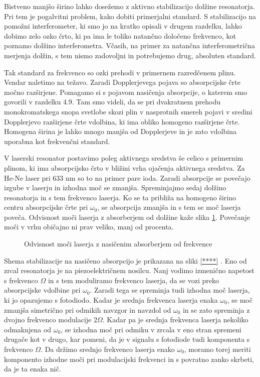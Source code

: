 Bistveno manjšo širino lahko dosežemo z aktivno stabilizacijo dolžine
resonatorja. Pri tem je pogalvitni problem, kako dobiti primerjalni
standard. S stabilizacijo na pomožni interferometer, ki smo jo na kratko
opisali v drugem razdelku, lahko dobimo zelo ozko črto, ki pa ima le toliko
natančno določeno frekvenco, kot poznamo dolžino interferometra. Včasih,
na primer za natančna interferometrična merjenja dolžin, s tem nismo
zadovoljni in potrebujemo drug, absoluten standard.

Tak standard za frekvenco so ozki prehodi v primernem razredčenem plinu.
Vendar naletimo na težavo. Zaradi Dopplerjevega pojava so absorpcijske
črte močno razširjene. Pomagamo si s pojavom nasičenja absorpcije, o katerem
smo govorili v razdelku 4.9. Tam smo videli, da se pri dvakratnem prehodu
monokromatskega snopa svetlobe skozi plin v nasprotnih smereh pojavi v
sredini Dopplerjevo razširjene črte vdolbina, ki ima obliko homogeno
razširjene črte. Homogena širina je lahko mnogo manjša od Dopplerjeve in
je zato vdolbina uporabna kot frekvenčni standard.

V laserski resonator postavimo poleg aktivnega sredstva še celico s
primernim plinom, ki ima absorpcijsko črto v bližini vrha ojačenja
aktivnega sredstva. Za He-Ne laser pri 633 nm so to na primer pare ioda.
Zaradi absorpcije se povečajo izgube v laserju in izhodna moč se zmanjša.
Spreminjajmo sedaj dolžino resonatorja in s tem frekvenco laserja. Ko se ta
približa na homogeno širino centru absorpcijske črte pri $\omega_0$, se
absorpcija zmanjša in s tem se moč laserja poveča. Odvisnost moči
laserja z absorberjem od dolžine kaže slika \ref{s5.12}. Povečanje moči
v vrhu običajno ni prav veliko, manj od procenta.

\begin{figure}[tbp]
\label{s5.12} \vskip 5cm
\caption{Odvisnost moči laserja z nasičenim absorberjem od frekvence}
\end{figure}

Shema stabilizacije na nasičeno absorpcijo je prikazana na sliki \ref{****}%
. Eno od zrcal resonatorja je na piezoelektričnem nosilcu. Nanj vodimo
izmenično napetost s frekvenco $\Omega$ in s tem moduliramo frekvenco
laserja, da se vozi preko absorpcijske vdolbine pri $\omega_0$. Zaradi tega
se spreminja tudi izhodna moč laserja, ki jo opazujemo s fotodiodo. Kadar
je srednja frekvenca laserja enaka $\omega_0$, se moč zmanjša simetrično
pri odmikih navzgor in navzdol od $\omega_0$ in se zato spreminja z dvojno
frekvenco modulacije $2\Omega$. Kadar pa je srednja frekvenca laserja
nekoliko odmaknjena od $\omega_0$, se izhodna moč pri odmiku v zrcala v eno
stran spremeni drugače kot v drugo, kar pomeni, da je v signalu s fotodiode
tudi komponenta s frekvenco $\Omega$. Da držimo srednjo frekvenco laserja
enako $\omega_0$, moramo torej meriti komponento izhodne moči pri
modulacijski frekvenci in s povratno zanko skrbeti, da je ta enaka nič.

